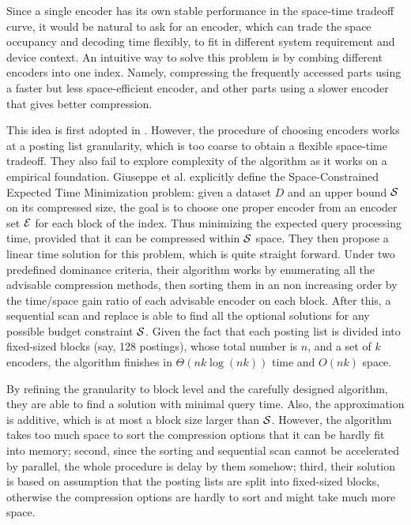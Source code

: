 \documentclass{sig-alternate-05-2015}
\begin{document}
Since a single encoder has its own stable performance in the space-time tradeoff curve, it would be natural to ask for an encoder, which can trade the space occupancy and decoding time flexibly, to fit in different system requirement and device context.
An intuitive way to solve this problem is by combing different encoders into one index.
Namely, compressing the frequently accessed parts using a faster but less space-efficient encoder, and other parts using a slower encoder that gives better compression.

This idea is first adopted in \cite{yan2009inverted}.
However, the procedure of choosing encoders works at a posting list granularity, which is too coarse to obtain a flexible space-time tradeoff.
They also fail to explore complexity of the algorithm as it works on a empirical foundation.
Giuseppe et al. \cite{ottaviano2015optimal} explicitly define the Space-Constrained Expected Time Minimization problem: given a dataset $ D $ and an upper bound $ \cal S $ on its compressed size, the goal is to choose one proper encoder from an encoder set $ \cal E $ for each block of the index.
Thus minimizing the expected query processing time, provided that it can be compressed within $ \cal S $ space.
They then propose a linear time solution for this problem, which is quite straight forward.
Under two predefined dominance criteria, their algorithm works by enumerating all the advisable compression methods, then sorting them in an non increasing order by the time/space gain ratio of each advisable encoder on each block.
After this, a sequential scan and replace is able to find all the optional solutions for any possible budget constraint $ \cal S $.
Given the fact that each posting list is divided into fixed-sized blocks (say, 128 postings), whose total number is $ n $, and a set of $ k $ encoders, the algorithm finishes in $ \Theta(nk\log(nk)) $ time and $ O(nk) $ space.

By refining the granularity to block level and the carefully designed algorithm, they are able to find a solution with minimal query time.
Also, the approximation is additive, which is at most a block size larger than $ \cal S $.
However, the algorithm takes too much space to sort the compression options that it can be hardly fit into memory; second, since the sorting and sequential scan cannot be accelerated by parallel, the whole procedure is delay by them somehow; third, their solution is based on assumption that the posting lists are split into fixed-sized blocks, otherwise the compression options are hardly to sort and might take much more space. 
\end{document}
